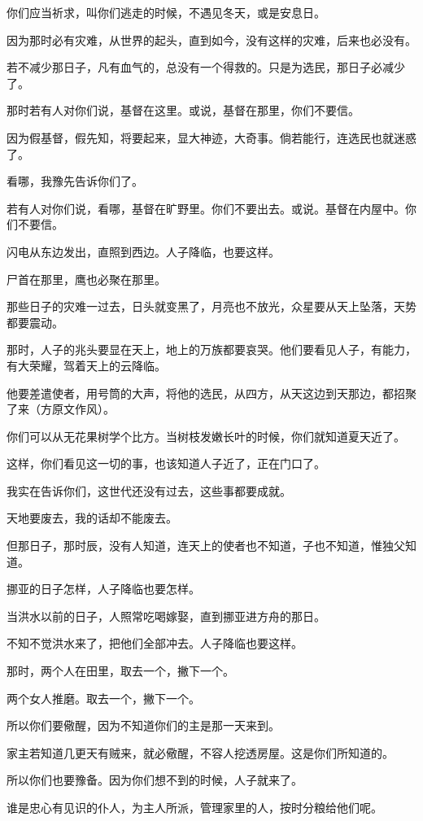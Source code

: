\documentclass[12pt,oneside]{book}
\begin{document}
你们应当祈求，叫你们逃走的时候，不遇见冬天，或是安息日。

因为那时必有灾难，从世界的起头，直到如今，没有这样的灾难，后来也必没有。

若不减少那日子，凡有血气的，总没有一个得救的。只是为选民，那日子必减少了。

那时若有人对你们说，基督在这里。或说，基督在那里，你们不要信。

因为假基督，假先知，将要起来，显大神迹，大奇事。倘若能行，连选民也就迷惑了。

看哪，我豫先告诉你们了。

若有人对你们说，看哪，基督在旷野里。你们不要出去。或说。基督在内屋中。你们不要信。

闪电从东边发出，直照到西边。人子降临，也要这样。

尸首在那里，鹰也必聚在那里。

那些日子的灾难一过去，日头就变黑了，月亮也不放光，众星要从天上坠落，天势都要震动。

那时，人子的兆头要显在天上，地上的万族都要哀哭。他们要看见人子，有能力，有大荣耀，驾着天上的云降临。

他要差遣使者，用号筒的大声，将他的选民，从四方，从天这边到天那边，都招聚了来（方原文作风）。

你们可以从无花果树学个比方。当树枝发嫩长叶的时候，你们就知道夏天近了。

这样，你们看见这一切的事，也该知道人子近了，正在门口了。

我实在告诉你们，这世代还没有过去，这些事都要成就。

天地要废去，我的话却不能废去。

但那日子，那时辰，没有人知道，连天上的使者也不知道，子也不知道，惟独父知道。

挪亚的日子怎样，人子降临也要怎样。

当洪水以前的日子，人照常吃喝嫁娶，直到挪亚进方舟的那日。

不知不觉洪水来了，把他们全部冲去。人子降临也要这样。

那时，两个人在田里，取去一个，撇下一个。

两个女人推磨。取去一个，撇下一个。

所以你们要儆醒，因为不知道你们的主是那一天来到。

家主若知道几更天有贼来，就必儆醒，不容人挖透房屋。这是你们所知道的。

所以你们也要豫备。因为你们想不到的时候，人子就来了。

谁是忠心有见识的仆人，为主人所派，管理家里的人，按时分粮给他们呢。
\end{document}
